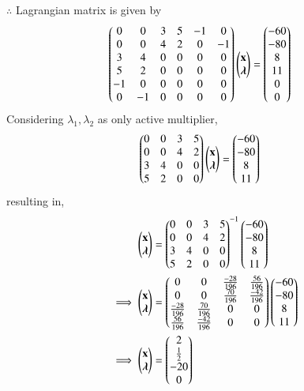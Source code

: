 $\therefore$ Lagrangian matrix is given by
\begin{align}
    \begin{pmatrix}0 & 0 & 3 & 5 & -1 & 0 \\ 0 & 0 & 4 & 2 & 0 & -1 \\ 3 & 4 & 0 & 0 & 0 & 0 \\ 5 & 2 & 0 & 0 & 0 & 0 \\ -1 & 0 & 0 & 0 & 0 & 0 \\ 0 & -1 & 0 & 0 & 0 & 0\end{pmatrix}\begin{pmatrix}\mathbf{x} \\ \boldsymbol{\lambda} \end{pmatrix} &= \begin{pmatrix}-60 \\ -80 \\ 8 \\ 11 \\ 0 \\0 \end{pmatrix}
\end{align}
Considering $\lambda_1,\lambda_2$ as only active multiplier,
\begin{align}
    \begin{pmatrix}0 & 0 & 3 & 5 \\ 0 & 0 & 4 & 2 \\ 3 & 4 & 0 & 0 \\ 5 & 2 & 0 & 0\end{pmatrix}\begin{pmatrix}\mathbf{x}\\ \boldsymbol{\lambda}\end{pmatrix} &= \begin{pmatrix}-60 \\ -80 \\ 8 \\ 11\end{pmatrix}
\end{align}
resulting in,
\begin{align}
    \begin{pmatrix}\mathbf{x} \\ \boldsymbol{\lambda}\end{pmatrix} &= \begin{pmatrix}0 & 0 & 3 & 5 \\ 0 & 0 & 4 & 2 \\ 3 & 4 & 0 & 0 \\ 5 & 2 & 0 & 0\end{pmatrix}^{-1}\begin{pmatrix}-60 \\-80 \\ 8 \\ 11\end{pmatrix}
    \\
    \implies   \begin{pmatrix}\mathbf{x} \\ \boldsymbol{\lambda}\end{pmatrix} &= \begin{pmatrix}0 & 0 & \frac{-28}{196} & \frac{56}{196} \\ 0 & 0 & \frac{70}{196} & \frac{-42}{196} \\ \frac{-28}{196} & \frac{70}{196} & 0 & 0 \\ \frac{56}{196} & \frac{-42}{196} & 0 & 0\end{pmatrix}\begin{pmatrix}-60 \\-80 \\ 8 \\ 11\end{pmatrix}
    \\
    \implies \begin{pmatrix}\mathbf{x} \\ \boldsymbol{\lambda}\end{pmatrix} &= \begin{pmatrix}2 \\ \frac{1}{2} \\ -20 \\ 0 \end{pmatrix}
\end{align}
